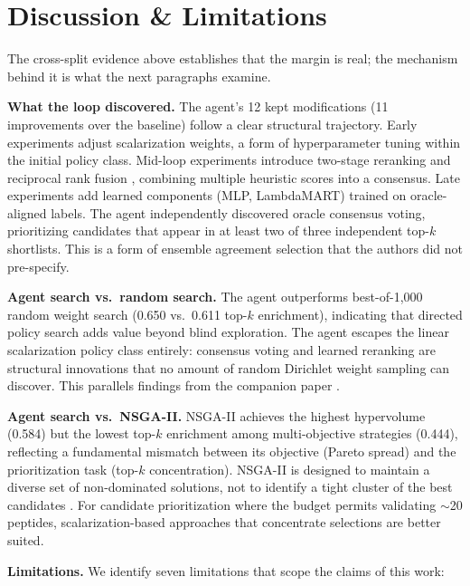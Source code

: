 \section{Discussion \& Limitations}
\label{sec:discussion}

The cross-split evidence above establishes that the margin is real; the mechanism behind it is what the next paragraphs examine.

\textbf{What the loop discovered.}
The agent's 12 kept modifications (11 improvements over the baseline) follow a clear structural trajectory.
Early experiments adjust scalarization weights, a form of hyperparameter tuning within the initial policy class.
Mid-loop experiments introduce two-stage reranking and reciprocal rank fusion \citep{cormack2009rrf}, combining multiple heuristic scores into a consensus.
Late experiments add learned components (MLP, LambdaMART) trained on oracle-aligned labels.
The agent independently discovered oracle consensus voting, prioritizing candidates that appear in at least two of three independent top-$k$ shortlists. This is a form of ensemble agreement selection that the authors did not pre-specify.

\textbf{Agent search vs.\ random search.}
The agent outperforms best-of-1{,}000 random weight search (0.650 vs.\ 0.611 top-$k$ enrichment), indicating that directed policy search adds value beyond blind exploration.
The agent escapes the linear scalarization policy class entirely: consensus voting and learned reranking are structural innovations that no amount of random Dirichlet weight sampling can discover.
This parallels findings from the companion paper \citep{wijaya2026autonomousagentdiscoversmolecular}.

\textbf{Agent search vs.\ NSGA-II.}
NSGA-II \citep{deb2002nsga2} achieves the highest hypervolume (0.584) but the lowest top-$k$ enrichment among multi-objective strategies (0.444), reflecting a fundamental mismatch between its objective (Pareto spread) and the prioritization task (top-$k$ concentration).
NSGA-II is designed to maintain a diverse set of non-dominated solutions, not to identify a tight cluster of the best candidates \citep{emmerich2018tutorial}.
For candidate prioritization where the budget permits validating ${\sim}$20 peptides, scalarization-based approaches that concentrate selections are better suited.

\textbf{Limitations.}
We identify seven limitations that scope the claims of this work:

